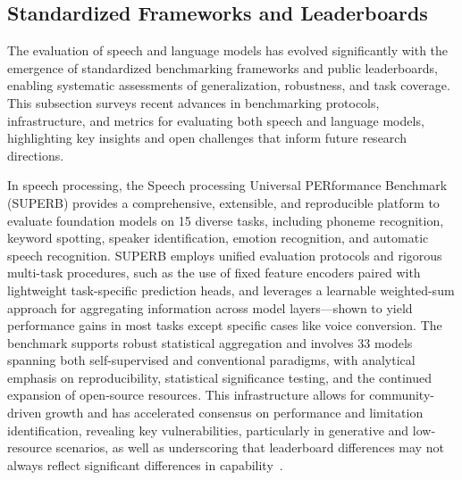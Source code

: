 \documentclass[sigconf]{acmart}
\begin{document}
\subsection{Standardized Frameworks and Leaderboards}

The evaluation of speech and language models has evolved significantly with the emergence of standardized benchmarking frameworks and public leaderboards, enabling systematic assessments of generalization, robustness, and task coverage. This subsection surveys recent advances in benchmarking protocols, infrastructure, and metrics for evaluating both speech and language models, highlighting key insights and open challenges that inform future research directions.

In speech processing, the Speech processing Universal PERformance Benchmark (SUPERB) provides a comprehensive, extensible, and reproducible platform to evaluate foundation models on 15 diverse tasks, including phoneme recognition, keyword spotting, speaker identification, emotion recognition, and automatic speech recognition. SUPERB employs unified evaluation protocols and rigorous multi-task procedures, such as the use of fixed feature encoders paired with lightweight task-specific prediction heads, and leverages a learnable weighted-sum approach for aggregating information across model layers—shown to yield performance gains in most tasks except specific cases like voice conversion. The benchmark supports robust statistical aggregation and involves 33 models spanning both self-supervised and conventional paradigms, with analytical emphasis on reproducibility, statistical significance testing, and the continued expansion of open-source resources. This infrastructure allows for community-driven growth and has accelerated consensus on performance and limitation identification, revealing key vulnerabilities, particularly in generative and low-resource scenarios, as well as underscoring that leaderboard differences may not always reflect significant differences in capability~\cite{ref101,ref104}.
\end{document}
